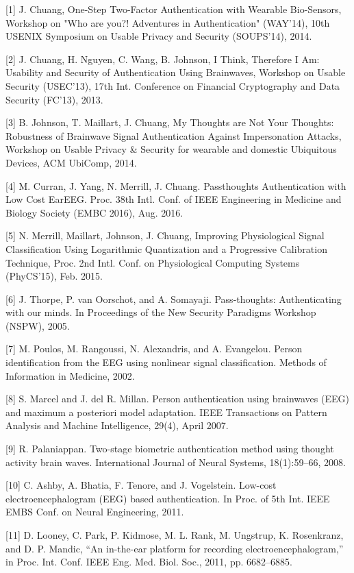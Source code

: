 \documentclass[11pt]{article}
\begin{document}
[1]
J. Chuang, One-Step Two-Factor Authentication with Wearable Bio-Sensors, Workshop on
"Who are you?! Adventures in Authentication" (WAY'14), 10th USENIX Symposium on
Usable Privacy and Security (SOUPS'14), 2014.

[2]
J. Chuang, H. Nguyen, C. Wang, B. Johnson, I Think, Therefore I Am: Usability and
Security of Authentication Using Brainwaves, Workshop on Usable Security (USEC'13),
17th Int. Conference on Financial Cryptography and Data Security (FC’13), 2013.

[3]
B. Johnson, T. Maillart, J. Chuang, My Thoughts are Not Your Thoughts: Robustness of
Brainwave Signal Authentication Against Impersonation Attacks, Workshop on Usable
Privacy \& Security for wearable and domestic Ubiquitous Devices, ACM UbiComp, 2014.

[4]
M. Curran, J. Yang, N. Merrill, J. Chuang. Passthoughts Authentication with Low Cost
EarEEG. Proc. 38th Intl. Conf. of IEEE Engineering in Medicine and Biology Society
(EMBC 2016), Aug. 2016.

[5]
N. Merrill, Maillart, Johnson, J. Chuang, Improving Physiological Signal Classification Using
Logarithmic Quantization and a Progressive Calibration Technique, Proc. 2nd Intl. Conf. on
Physiological Computing Systems (PhyCS'15), Feb. 2015.

[6]
J. Thorpe, P. van Oorschot, and A. Somayaji. Pass-thoughts: Authenticating with our
minds. In Proceedings of the New Security Paradigms Workshop (NSPW), 2005.

[7]
M. Poulos, M. Rangoussi, N. Alexandris, and A. Evangelou. Person identification from the
EEG using nonlinear signal classification. Methods of Information in Medicine, 2002.

[8]
S. Marcel and J. del R. Millan. Person authentication using brainwaves (EEG) and
maximum a posteriori model adaptation. IEEE Transactions on Pattern Analysis and
Machine Intelligence, 29(4), April 2007.

[9]
R. Palaniappan. Two-stage biometric authentication method using thought activity brain
waves. International Journal of Neural Systems, 18(1):59–66, 2008.

[10]
C. Ashby, A. Bhatia, F. Tenore, and J. Vogelstein. Low-cost electroencephalogram (EEG)
based authentication. In Proc. of 5th Int. IEEE EMBS Conf. on Neural Engineering, 2011.

[11]
D. Looney, C. Park, P. Kidmose, M. L. Rank, M. Ungstrup, K. Rosenkranz, and D. P.
Mandic, “An in-the-ear platform for recording electroencephalogram,” in Proc. Int. Conf.
IEEE Eng. Med. Biol. Soc., 2011, pp. 6682–6885.
\end{document}
